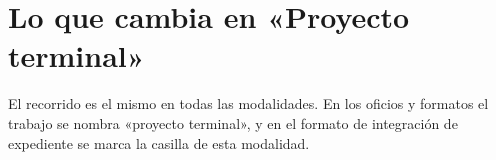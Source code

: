 \section{Lo que cambia en «Proyecto terminal»}
El recorrido es el mismo en todas las modalidades. En los oficios y formatos el trabajo se nombra «proyecto terminal», y en el formato de integración de expediente se marca la casilla de esta modalidad.
